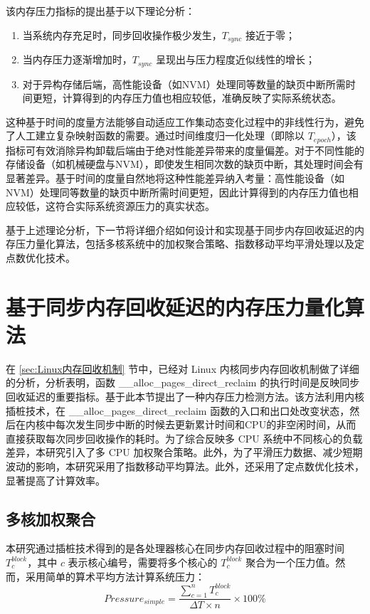 该内存压力指标的提出基于以下理论分析：

\begin{enumerate}
    \item 当系统内存充足时，同步回收操作极少发生，$T_{sync}$ 接近于零；
    \item 当内存压力逐渐增加时，$T_{sync}$ 呈现出与压力程度近似线性的增长；
    \item 对于异构存储后端，高性能设备（如NVM）处理同等数量的缺页中断所需时间更短，计算得到的内存压力值也相应较低，准确反映了实际系统状态。
\end{enumerate}

这种基于时间的度量方法能够自动适应工作集动态变化过程中的非线性行为，避免了人工建立复杂映射函数的需要。通过时间维度归一化处理（即除以 $T_{epoch}$），该指标可有效消除异构卸载后端由于绝对性能差异带来的度量偏差。对于不同性能的存储设备（如机械硬盘与NVM），即使发生相同次数的缺页中断，其处理时间会有显著差异。基于时间的度量自然地将这种性能差异纳入考量：高性能设备（如NVM）处理同等数量的缺页中断所需时间更短，因此计算得到的内存压力值也相应较低，这符合实际系统资源压力的真实状态。

基于上述理论分析，下一节将详细介绍如何设计和实现基于同步内存回收延迟的内存压力量化算法，包括多核系统中的加权聚合策略、指数移动平均平滑处理以及定点数优化技术。

\section{基于同步内存回收延迟的内存压力量化算法}
\label{sec:基于同步内存回收延迟的内存压力量化算法}

在 \ref{sec:Linux内存回收机制} 节中，已经对 Linux 内核同步内存回收机制做了详细的分析，分析表明，函数 \_\_alloc\_pages\_direct\_reclaim 的执行时间是反映同步回收延迟的重要指标。基于此本节提出了一种内存压力检测方法。该方法利用内核插桩技术，在 \_\_alloc\_pages\_direct\_reclaim 函数的入口和出口处改变状态，然后在内核中每次发生同步中断的时候去更新累计时间和CPU的非空闲时间，从而直接获取每次同步回收操作的耗时。为了综合反映多  CPU  系统中不同核心的负载差异，本研究引入了多  CPU  加权聚合策略。此外，为了平滑压力数据、减少短期波动的影响，本研究采用了指数移动平均算法。此外，还采用了定点数优化技术，显著提高了计算效率。

\subsection{多核加权聚合}
\label{sec:weighted_aggregation}
本研究通过插桩技术得到的是各处理器核心在同步内存回收过程中的阻塞时间 \(T_c^{block}\)，其中 \(c\) 表示核心编号，需要将多个核心的 \(T_c^{block}\) 聚合为一个压力值。然而，采用简单的算术平均方法计算系统压力：
\begin{equation}
    \label{eq:simple_average_pressure}
    Pressure_{simple} = \frac{\sum_{c=1}^{n} T_c^{block}}{\Delta T \times n} \times 100\%
\end{equation}

